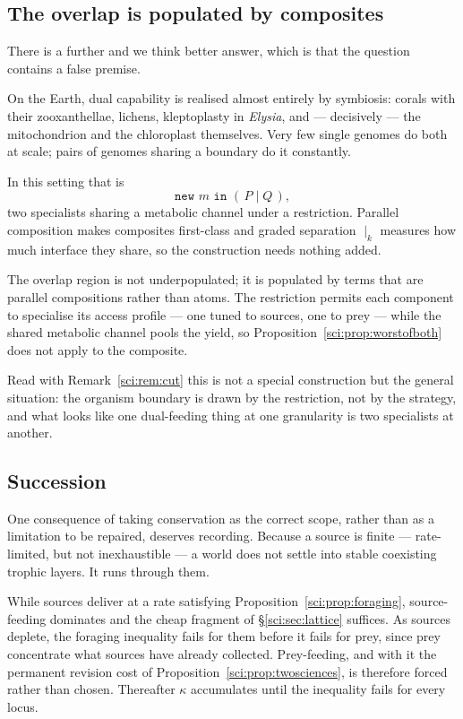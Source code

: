 \subsection{The overlap is populated by composites}\label{sci:S11.5}

There is a further and we think better answer, which is that the question contains a false premise.

On the Earth, dual capability is realised almost entirely by symbiosis: corals with their
zooxanthellae, lichens, kleptoplasty in \emph{Elysia}, and --- decisively --- the mitochondrion and
the chloroplast themselves. Very few single genomes do both at scale; pairs of genomes sharing a
boundary do it constantly.

In this setting that is
\[
\texttt{new } m \texttt{ in } (\,P \mid Q\,) ,
\]
two specialists sharing a metabolic channel under a restriction. Parallel composition makes composites
first-class and graded separation $\mid_k$ measures how much interface they share, so the construction
needs nothing added.

\begin{proposition}
\label{sci:prop:composite}
The overlap region is not underpopulated; it is populated by terms that are parallel compositions
rather than atoms. The restriction permits each component to specialise its access profile --- one
tuned to sources, one to prey --- while the shared metabolic channel pools the yield, so
Proposition~\ref{sci:prop:worstofboth} does not apply to the composite.
\end{proposition}

Read with Remark~\ref{sci:rem:cut} this is not a special construction but the general situation: the
organism boundary is drawn by the restriction, not by the strategy, and what looks like one
dual-feeding thing at one granularity is two specialists at another.

\subsection{Succession}\label{sci:S11.6}

One consequence of taking conservation as the correct scope, rather than as a limitation to be
repaired, deserves recording. Because a source is finite --- rate-limited, but not inexhaustible --- a
world does not settle into stable coexisting trophic layers. It runs through them.

\begin{proposition}
\label{sci:prop:succession}
While sources deliver at a rate satisfying Proposition~\ref{sci:prop:foraging}, source-feeding dominates
and the cheap fragment of \S\ref{sci:sec:lattice} suffices. As sources deplete, the foraging inequality
fails for them before it fails for prey, since prey concentrate what sources have already collected.
Prey-feeding, and with it the permanent revision cost of
Proposition~\ref{sci:prop:twosciences}, is therefore forced rather than chosen. Thereafter $\kappa$
accumulates until the inequality fails for every locus.
\end{proposition}

